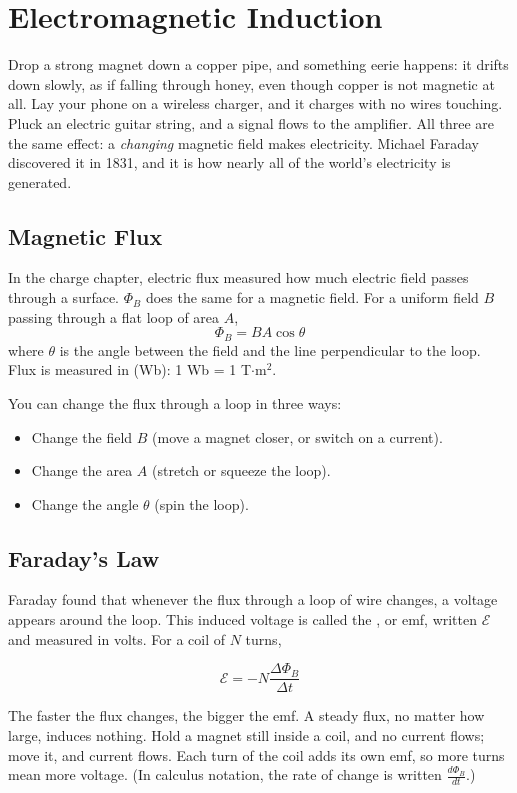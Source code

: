 \chapter{Electromagnetic Induction}

Drop a strong magnet down a copper pipe, and something eerie happens: it
drifts down slowly, as if falling through honey, even though copper is not
magnetic at all. Lay your phone on a wireless charger, and it charges with
no wires touching. Pluck an electric guitar string, and a signal flows to
the amplifier. All three are the same effect: a \emph{changing} magnetic
field makes electricity. Michael Faraday discovered it in 1831, and it is
how nearly all of the world's electricity is generated.

\section{Magnetic Flux}
In the charge chapter, electric flux measured how much electric field
passes through a surface.  $\Phi_B$ does the same for
a magnetic field. For a uniform field $B$ passing through a flat loop of
area $A$,
$$\Phi_B = BA\cos\theta$$
where $\theta$ is the angle between the field and the line perpendicular to
the loop. Flux is measured in  (Wb): 1 Wb = 1 T$\cdot$m$^2$.

You can change the flux through a loop in three ways:
\begin{itemize}
\item Change the field $B$ (move a magnet closer, or switch on a current).
\item Change the area $A$ (stretch or squeeze the loop).
\item Change the angle $\theta$ (spin the loop).
\end{itemize}

\section{Faraday's Law}
Faraday found that whenever the flux through a loop of wire changes, a
voltage appears around the loop. This induced voltage is called the
, or emf, written
$\mathcal{E}$ and measured in volts. For a coil of $N$ turns,
\begin{mdframed}[style=important, frametitle={Faraday's Law}]
$$\mathcal{E} = -N\frac{\Delta\Phi_B}{\Delta t}$$
\end{mdframed}
The faster the flux changes, the bigger the emf. A steady flux, no matter
how large, induces nothing. Hold a magnet still inside a coil, and no
current flows; move it, and current flows. Each turn of the coil adds its
own emf, so more turns mean more voltage. (In calculus notation, the rate
of change is written $\frac{d\Phi_B}{dt}$.)

